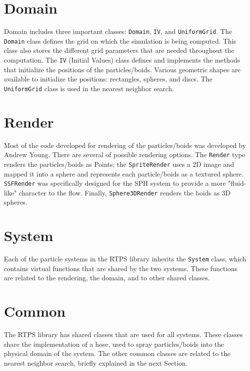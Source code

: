 \section{Domain}
Domain includes three important classes: \texttt{Domain}, \texttt{IV}, and \texttt{UniformGrid}. The \texttt{Domain} class defines the grid on which the simulation is being computed. This class also stores the different grid parameters that are needed throughout the computation. The \texttt{IV} (Initial Values) class defines and implements the methods that initialize the positions of the particles/boids. Various geometric shapes are available to initialize the positions: rectangles, spheres, and discs. The \texttt{UniformGrid} class is used in the nearest neighbor search.

\section{Render}
Most of the code developed for rendering of the particles/boids was developed by Andrew Young\cite{andrewBlog}. There are several of possible rendering options. The \texttt{Render} type renders the particles/boids as Points; the \texttt{SpriteRender} uses a 2D image and mapped it into a sphere and represents each particle/boids as a textured sphere. \texttt{SSFRender} was specifically designed for the SPH system to provide a more "fluid-like" character to the flow. Finally, \texttt{Sphere3DRender} renders the boids as 3D spheres.  

\section{System}
Each of the particle systems in the RTPS library inherits the \texttt{System} class, which contains virtual functions that are shared by the two systems. These functions are related to the rendering,  the domain, and to other shared classes. 

\section{Common}\label{commonsection}
The RTPS library has shared classes that are used for all systems. These classes share the implementation of a hose, used to spray particles/boids into the physical domain of the system. The other common classes are related to the nearest neighbor search, briefly explained in the next Section. 

